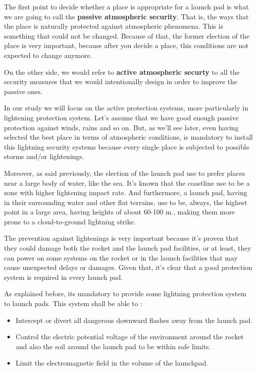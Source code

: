 The first point to decide whether a place is appropriate for a launch pad is what
we are going to call the \textbf{passive atmospheric security}. That is, the
ways that the place is naturally protected against atmospheric phenomena. This is
something that could not be changed. Because of that, the former election of the
place is very important, because after you decide a place, this conditions
are not expected to change anymore.

On the other side, we would refer to \textbf{active atmospheric securty} to
all the security measures that we would intentionally design in order to improve
the passive ones.

In our study we will focus on the active protection systems, more particularly
in lightening protection system. Let's assume that we have good enough passive
protection against winds, rains and so on. But, as we'll see later, even having
selected the best place in terms of atmospheric conditions, is mandatory to
install this lightning security systems because every single place is subjected
to possible storms and/or lightenings.

Moreover, as said previously, the election of the launch pad use to prefer places
near a large body of water, like the sea. It’s known that the coastline use to be
a zone with higher lightening impact rate. And furthermore, a launch pad, having
in their surrounding water and other flat terrains, use to be, always, the highest
point in a large area, having heights of about 60-100 m., making them more prone
to a cloud-to-ground lightning strike.

The prevention against lightenings is very important because it’s proven that
they could damage both the rocket and the launch pad facilities, or at least,
they can power on some systems on the rocket or in the launch facilities that
may cause unexpected delays or damages. Given that, it’s clear that a good
protection system is required in every launch pad.

As explained before, its mandatory to provide some lightning protection system to
launch pads. This system shall be able to \cite{RONGIER201327}:

\begin{itemize}
	\item Intercept or divert all dangerous downward flashes away from the launch pad.
	\item Control the electric potential voltage of the environment around the
	rocket and also the soil around the launch pad to be within safe limits.
	\item Limit the electromagnetic field in the volume of the launchpad.
\end{itemize}

